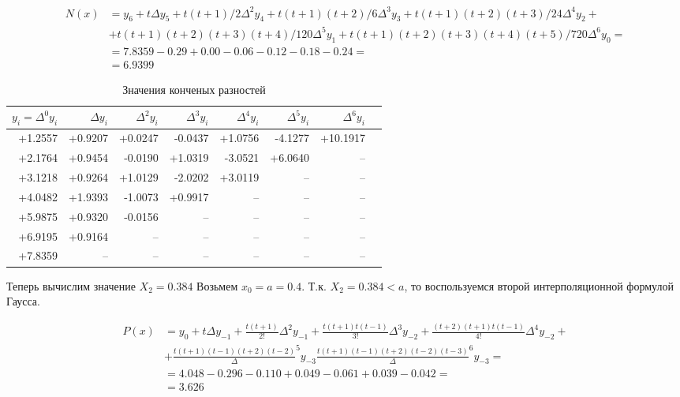 \documentclass{article}
\begin{document}
\begin{align*}
  N(x) &= y_6 + t \Delta y_5 + t(t+1)/2 \Delta^2 y_4 + t(t+1)(t+2)/6 \Delta^3 y_3 + t(t+1)(t+2)(t+3)/24 \Delta^4 y_2 + \\ &+ t(t+1)(t+2)(t+3)(t+4)/120 \Delta^5 y_1 + 
  t(t+1)(t+2)(t+3)(t+4)(t+5)/720 \Delta^6 y_0 = \\
  &= 7.8359 -0.29 + 0.00 -0.06 -0.12 -0.18 -0.24 = \\
  &= 6.9399
\end{align*}

\begin{table}
  \caption{Значения конченых разностей}\label{tab:finite_dif}
  \centering
  \begin{tabular}{rrrrrrrr}
    \toprule
      \(y_i = \Delta^0 y_i\)
    & \(\Delta y_i\)
    & \(\Delta^2 y_i\)
    & \(\Delta^3 y_i\)
    & \(\Delta^4 y_i\)
    & \(\Delta^5 y_i\)
    & \(\Delta^6 y_i\) \\
    \midrule
    +1.2557  &      +0.9207 &       +0.0247 &       -0.0437 &       +1.0756 &       -4.1277 &       +10.1917 \\
    +2.1764  &      +0.9454 &       -0.0190 &       +1.0319 &       -3.0521 &       +6.0640 & -- \\
    +3.1218  &      +0.9264 &       +1.0129 &       -2.0202 &       +3.0119 & -- & -- \\
    +4.0482  &      +1.9393 &       -1.0073 &       +0.9917 & -- & -- & -- \\
    +5.9875  &      +0.9320 &       -0.0156 & -- & -- & -- & -- \\
    +6.9195  &      +0.9164 & -- & -- & -- & -- & -- \\
    +7.8359  &  -- & -- & -- & -- & -- & -- \\

    \bottomrule
  \end{tabular}
\end{table}

Теперь вычислим значение \(X_2 = 0.384 \)
Возьмем \(x_0 = a = 0.4 \).
Т.к. \(X_2 = 0.384 < a \), то воспользуемся
второй интерполяционной формулой Гаусса.

\begin{align*}
  P(x) &=
  y_0 + t \Delta y_{-1} + \frac{t(t+1)}{2!} \Delta^2 y_{-1}
  + \frac{t(t+1)t(t-1)}{3!} \Delta^3 y_{-2} +
  \frac{(t+2)(t+1)t(t-1)}{4!} \Delta^4 y_{-2} + \\
  &+ \frac{t(t+1)(t-1)(t+2)(t-2)} \Delta^5 y_{-3}
  \frac{t(t+1)(t-1)(t+2)(t-2)(t-3)} \Delta^6 y_{-3} = \\
  &= 4.048  -0.296  -0.110 + 0.049  -0.061 + 0.039  -0.042 = \\
  &= 3.626
\end{align*}
\end{document}
